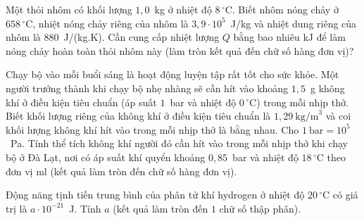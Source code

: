	\begin{ex}%
		Một thỏi nhôm có khối lượng $1{,}0$~kg ở nhiệt độ $8\,^\circ\text{C}$. Biết nhôm nóng chảy ở $658\,^\circ\text{C}$, nhiệt nóng chảy riêng của nhôm là $3{,}9\cdot 10^5$~J/kg và nhiệt dung riêng của nhôm là $880$~J/(kg.K). Cần cung cấp nhiệt lượng $Q$ bằng bao nhiêu kJ để làm nóng chảy hoàn toàn thỏi nhôm này (làm tròn kết quả đến chữ số hàng đơn vị)?
		\par
	\end{ex}

	\begin{ex}%
		Chạy bộ vào mỗi buổi sáng là hoạt động luyện tập rất tốt cho sức khỏe. Một người trưởng thành khi chạy bộ nhẹ nhàng sẽ cần hít vào khoảng $1{,}5$~g không khí ở điều kiện tiêu chuẩn (áp suất $1$~bar và nhiệt độ $0\,^\circ\text{C}$) trong mỗi nhịp thở. Biết khối lượng riêng của không khí ở điều kiện tiêu chuẩn là $1{,}29~\text{kg/m}^3$ và coi khối lượng không khí hít vào trong mỗi nhịp thở là bằng nhau. Cho $1~\text{bar}=10^5$~Pa. Tính thể tích không khí người đó cần hít vào trong mỗi nhịp thở khi chạy bộ ở Đà Lạt, nơi có áp suất khí quyển khoảng $0{,}85$~bar và nhiệt độ $18\,^\circ\text{C}$ theo đơn vị ml (kết quả làm tròn đến chữ số hàng đơn vị).
		\par
	\end{ex}

	\begin{ex}%
		Động năng tịnh tiến trung bình của phân tử khí hydrogen ở nhiệt độ $20\,^\circ\text{C}$ có giá trị là $a\cdot 10^{-21}$~J. Tính $a$ (kết quả làm tròn đến $1$ chữ số thập phân).
		\par
	\end{ex}

